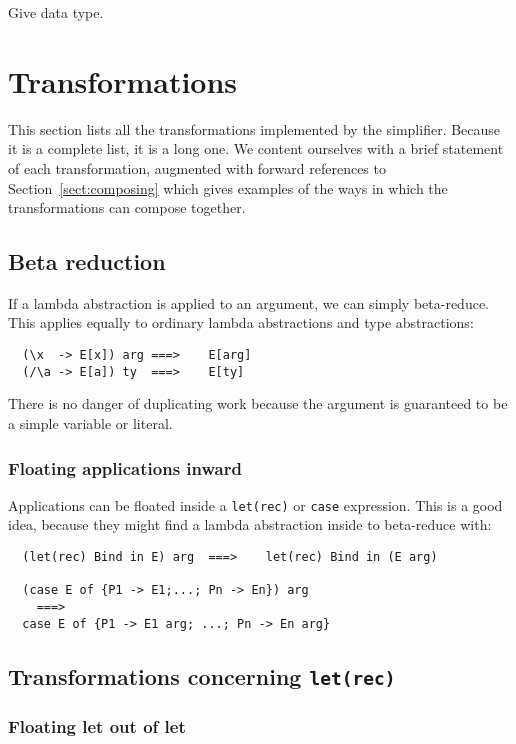 \documentclass[11pt]{article}
\begin{document}
Give data type.

\section{Transformations}

This section lists all the transformations implemented by the simplifier.
Because it is a complete list, it is a long one.
We content ourselves with a brief statement of each transformation, 
augmented with forward references to Section~\ref{sect:composing}
which gives examples of the ways in which the transformations can compose together.

\subsection{Beta reduction}

If a lambda abstraction is applied to an argument, we can simply
beta-reduce.  This applies equally to ordinary lambda abstractions and 
type abstractions:
\begin{lstlisting}
  (\x  -> E[x]) arg	===>	E[arg]
  (/\a -> E[a]) ty	===> 	E[ty]
\end{lstlisting}
There is no danger of duplicating work because the argument is 
guaranteed to be a simple variable or literal.

\subsubsection{Floating applications inward}

Applications can be floated inside a \texttt{let(rec)} or \texttt{case} expression.
This is a good idea, because they might find a lambda abstraction inside
to beta-reduce with:
\begin{lstlisting}
  (let(rec) Bind in E) arg	===>	let(rec) Bind in (E arg)

  (case E of {P1 -> E1;...; Pn -> En}) arg	
	===> 
  case E of {P1 -> E1 arg; ...; Pn -> En arg}
\end{lstlisting}



\subsection{Transformations concerning \texttt{let(rec)}}

\subsubsection{Floating let out of let}
\end{document}
